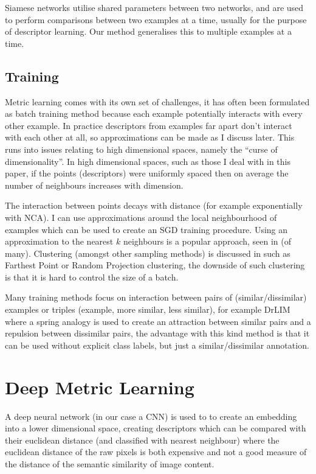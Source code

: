 Siamese networks utilise shared parameters between two networks, and are used to perform comparisons between two examples at a time, usually for the purpose of descriptor learning. Our method generalises this to multiple examples at a time.

\subsection {Training}

Metric learning comes with its own set of challenges, it has often been formulated as batch training method because each example potentially interacts with every other example. In practice descriptors from examples far apart don't interact with each other at all, so approximations can be made as I discuss later. This runs into issues relating to high dimensional spaces, namely the ``curse of dimensionality''. In high dimensional spaces, such as those I deal with in this paper, if the points (descriptors) were uniformly spaced then on average the number of neighbours increases with dimension. 

The interaction between points decays with distance (for example exponentially with \gls{NCA}). I can use approximations around the local neighbourhood of examples which can be used to create an \gls{SGD} training procedure. Using an approximation to the nearest $ k $ neighbours is a popular approach, seen in \cite{Mensink2012,Zaidi2011} (of many). Clustering (amongst other sampling methods) is discussed in  \cite{Oneat2011} such as Farthest Point or Random Projection clustering, the downside of such clustering is that it is hard to control the size of a batch. 

Many training methods focus on interaction between pairs of (similar/dissimilar) examples or triples (example, more similar, less similar), for example DrLIM \cite{Hadsell2006} where a spring analogy is used to create an attraction between similar pairs and a repulsion between dissimilar pairs, the advantage with this kind method is that it can be used without explicit class labels, but just a similar/dissimilar annotation.

\section {Deep Metric Learning}

A deep neural network (in our case a \gls{CNN}) is used to to create an embedding into a lower dimensional space, creating descriptors which can be compared with their euclidean distance (and classified with nearest neighbour) where the euclidean distance of the raw pixels is both expensive and not a good measure of the distance of the semantic similarity of image content. 

